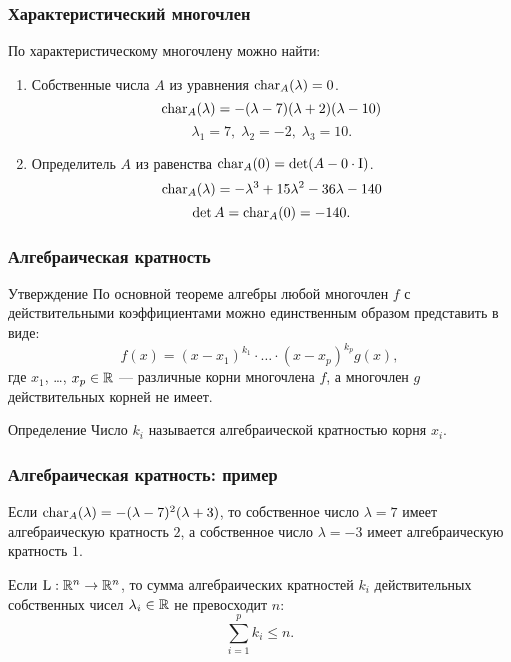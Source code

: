  \begin{frame}
     \frametitle{Характеристический многочлен}

     По характеристическому многочлену можно найти: \pause

     \begin{enumerate}
         \item Собственные числа $A$ из уравнения $\operatorname{char}_{A}(\lambda) = 0$.
         \[
            \operatorname{char}_{A}(\lambda)  = -(\lambda - 7)(\lambda + 2)(\lambda - 10)    
         \]
         \[
         \lambda_1 = 7, \; \lambda_2 = -2, \; \lambda_3 = 10.    
         \]
         
         \pause
         \item Определитель $A$ из равенства $\operatorname{char}_{A}(0) = \det (A - 0\cdot \mathrm{I})$.
         \[
            \operatorname{char}_{A}(\lambda) =-\lambda^3  + 15\lambda^2   -36 \lambda  - 140 
         \]
         \[
         \det A = \operatorname{char}_A(0)=-140.
         \]

     \end{enumerate}
 
 
 \end{frame}


 \begin{frame}
     \frametitle{Алгебраическая кратность}

     \begin{block}{Утверждение}
    По основной теореме алгебры любой многочлен $f$ с действительными коэффициентами можно единственным образом представить в виде:
    \[
    f(x) = (x-x_1)^{k_1} \cdot \ldots  \cdot (x-x_p)^{k_p} g(x),
    \]
    где $x_1$, \ldots, $x_p \in \mathbb{R}$ — различные корни многочлена $f$, а многочлен $g$ действительных корней не имеет. 
         
     \end{block}
 
     \pause
     \begin{block}{Определение}
        Число $k_i$ называется \alert{алгебраической кратностью} корня $x_i$.
     \end{block}
 
 \end{frame}


 \begin{frame}
     \frametitle{Алгебраическая кратность: пример}

     Если $\operatorname{char}_A(\lambda) = -(\lambda - 7)^2(\lambda + 3)$, то 
     собственное число $\lambda = 7$ имеет алгебраическую кратность $2$, 
     а собственное число $\lambda = -3$ имеет алгебраическую кратность $1$.
 
     \pause
     Если $\operatorname{L} : \mathbb{R}^n \to \mathbb{R}^n$, то сумма алгебраических кратностей $k_i$ 
     действительных собственных чисел $\lambda_i \in \mathbb{R}$
     не превосходит $n$:
    \[
    \sum_{i=1}^p k_i \leq n.
    \]

 \end{frame}



